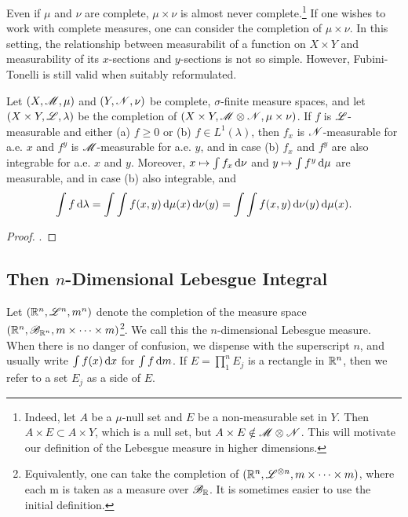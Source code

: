 \documentclass[12pt]{article} %
\begin{document}
Even if $\mu$ and $\nu$ are complete, $\mu \times \nu$ is almost never complete.\footnote{Indeed, let $A$ be a $\mu$-null set and $E$ be a non-measurable set in $Y$. Then $A \times E \subset A \times Y$, which is a null set, but $A \times E \notin \mathscr{M} \otimes \mathscr{N}$. This will motivate our definition of the Lebesgue measure in higher dimensions.} If one wishes to work with complete measures, one can consider the completion of $\mu \times \nu$. In this setting, the relationship between measurabilit of a function on $X \times Y$ and measurability of its $x$-sections and $y$-sections is not so simple. However, Fubini-Tonelli is still valid when suitably reformulated. 

\begin{theorem}
    Let $(X, \mathscr{M}, \mu)$ and $(Y, \mathscr{N}, \nu)$ be complete, $\sigma$-finite measure spaces, and let $(X \times Y, \mathscr{L}, \lambda)$ be the completion of $(X \times Y, \mathscr{M} \otimes \mathscr{N}, \mu \times \nu)$. If $f$ is $\mathscr{L}$-measurable and either (a) $f \geq 0$ or (b) $f \in L^1(\lambda)$, then $f_x$ is $\mathscr{N}$-measurable for a.e. $x$ and $f^y$ is $\mathscr{M}$-measurable for a.e. $y$, and in case (b) $f_x$ and $f^y$ are also integrable for a.e. $x$ and $y$. Moreover, $x \mapsto \int f_x \, \mathrm{d} \nu$ and $y \mapsto \int f^y \, \mathrm{d} \mu$ are measurable, and in case (b) also integrable, and \[\int f \, \mathrm{d} \lambda = \int \int f(x, y) \, \mathrm{d} \mu(x) \, \mathrm{d} \nu(y) = \int \int f(x, y) \, \mathrm{d} \nu(y) \, \mathrm{d} \mu(x).\]
\end{theorem}

\begin{proof}
    \cite[Exercise~49]{folland1999real}.
\end{proof}

\subsection{Then $n$-Dimensional Lebesgue Integral}

\begin{definition}
    Let $(\mathbb{R}^n, \mathscr{L}^n, m^n)$ denote the completion of the measure space $\left(\mathbb{R}^n, \mathscr{B}_{\mathbb{R}^n}, m \times \cdots \times m\right)$\footnote{Equivalently, one can take the completion of $\left(\mathbb{R}^n, \mathscr{L}^{\otimes n}, m \times \cdots \times m\right)$, where each m is taken as a measure over $\mathscr{B}_{\mathbb{R}}$. It is sometimes easier to use the initial definition.}. We call this the $n$-dimensional Lebesgue measure. When there is no danger of confusion, we dispense with the superscript $n$, and usually write $\int f(x) \, \mathrm{d} x$ for $\int f \, \mathrm{d} m$. If $E = \prod_1^n E_j$ is a rectangle in $\mathbb{R}^n$, then we refer to a set $E_j$ as a side of $E$. 
\end{definition}
\end{document}
